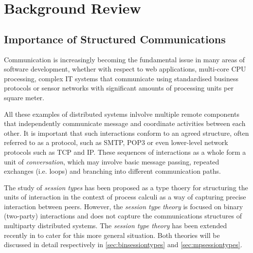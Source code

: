 
\chapter{Background Review}
\label{ch:background}


\section{Importance of Structured Communications}
\label{sec:structuredcommms}

Communication is increasingly becoming the fundamental issue in many areas of software development, whether with respect to web applications, multi-core CPU processing, complex IT systems that communicate using standardised business protocols or sensor networks with significant amounts of processing units per square meter\cite{sessionbased_programming}.

All these examples of distributed systems inlvolve multiple remote components that independently communicate message and coordinate activities between each other. It is important that such interactions conform to an agreed structure, often referred to as a protocol, such as SMTP, POP3\cite{sess_type_guided_distr_interact} or even lower-level network protocols such as TCP and IP. These sequences of interactions as a whole form a unit of \textit{conversation}, which may involve basic message passing, repeated exchanges (i.e. loops) and branching into different communication paths\cite{sessionbased_programming}.

The study of \textit{session types} has been proposed as a type thoery for structuring the units of interaction in the context of process calculi as a way of capturing precise interaction between peers\cite{sessionbased_programming, sess_type_guided_distr_interact}. However, the \textit{session type theory} is focused on binary (two-party) interactions and does not capture the communications structures of multiparty distributed systems. The \textit{session type theory} has been extended recently in \cite{multiparty_sess_types} to cater for this more general situation. Both theories will be discussed in detail respectively in \autoref{sec:binsessiontypes} and \ref{sec:mpsessiontypes}.




